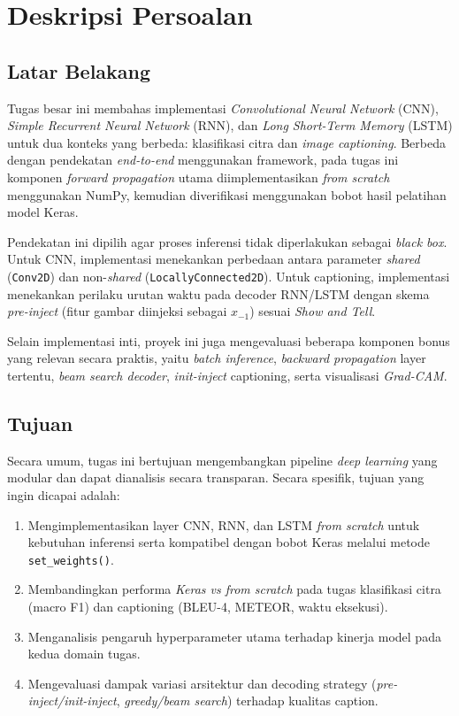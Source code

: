 
\chapter{Deskripsi Persoalan}

\section{Latar Belakang}
Tugas besar ini membahas implementasi \textit{Convolutional Neural Network} (CNN), \textit{Simple Recurrent Neural Network} (RNN), dan \textit{Long Short-Term Memory} (LSTM) untuk dua konteks yang berbeda: klasifikasi citra dan \textit{image captioning}. Berbeda dengan pendekatan \textit{end-to-end} menggunakan framework, pada tugas ini komponen \textit{forward propagation} utama diimplementasikan \textit{from scratch} menggunakan NumPy, kemudian diverifikasi menggunakan bobot hasil pelatihan model Keras.

Pendekatan ini dipilih agar proses inferensi tidak diperlakukan sebagai \textit{black box}. Untuk CNN, implementasi menekankan perbedaan antara parameter \textit{shared} (\texttt{Conv2D}) dan non-\textit{shared} (\texttt{LocallyConnected2D}). Untuk captioning, implementasi menekankan perilaku urutan waktu pada decoder RNN/LSTM dengan skema \textit{pre-inject} (fitur gambar diinjeksi sebagai $x_{-1}$) sesuai \textit{Show and Tell}.

Selain implementasi inti, proyek ini juga mengevaluasi beberapa komponen bonus yang relevan secara praktis, yaitu \textit{batch inference}, \textit{backward propagation} layer tertentu, \textit{beam search decoder}, \textit{init-inject} captioning, serta visualisasi \textit{Grad-CAM}.

\section{Tujuan}
Secara umum, tugas ini bertujuan mengembangkan pipeline \textit{deep learning} yang modular dan dapat dianalisis secara transparan. Secara spesifik, tujuan yang ingin dicapai adalah:

\begin{enumerate}
    \item Mengimplementasikan layer CNN, RNN, dan LSTM \textit{from scratch} untuk kebutuhan inferensi serta kompatibel dengan bobot Keras melalui metode \texttt{set\_weights()}.
    \item Membandingkan performa \textit{Keras vs from scratch} pada tugas klasifikasi citra (macro F1) dan captioning (BLEU-4, METEOR, waktu eksekusi).
    \item Menganalisis pengaruh hyperparameter utama terhadap kinerja model pada kedua domain tugas.
    \item Mengevaluasi dampak variasi arsitektur dan decoding strategy (\textit{pre-inject/init-inject}, \textit{greedy/beam search}) terhadap kualitas caption.
\end{enumerate}

